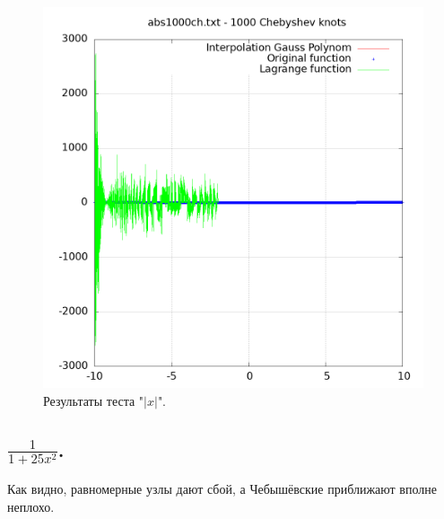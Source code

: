 \documentclass[14pt,a4paper]{extarticle}
\newcommand{\1}{\mathbbm{1}}
\begin{document}
    \begin{figure}
        \centering
        \includegraphics[scale=0.5]{Images/abs1000ch.txt.png}
        \caption{Результаты теста "$|x|$".}
    \end{figure}


    \subsection{$\frac{1}{1 + 25 x^2}$.}

    Как видно, равномерные узлы дают сбой, а Чебышёвские приближают вполне неплохо.
\end{document}
